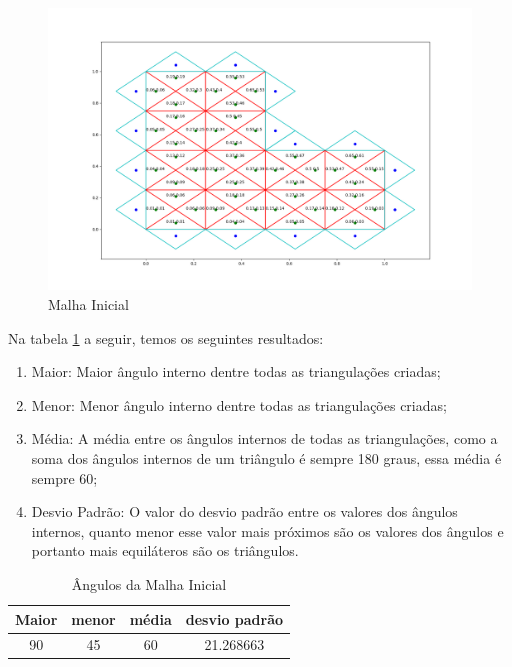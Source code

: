 \begin{figure}[ht]
    \centering
    \includegraphics[width=1\linewidth]{fig/malha_inicial.png}
    \caption{Malha Inicial}
    \label{fig:malha-inicial}
\end{figure}

Na tabela \ref{tab:angulos-malha-inicial} a seguir, temos os seguintes resultados:

\begin{enumerate}
    \item Maior: Maior ângulo interno dentre todas as triangulações criadas;
    \item Menor: Menor ângulo interno dentre todas as triangulações criadas;
    \item Média: A média entre os ângulos internos de todas as triangulações, como a soma dos ângulos internos de um triângulo é sempre 180 graus, essa média é sempre 60;
    \item Desvio Padrão: O valor do desvio padrão entre os valores dos ângulos internos, quanto menor esse valor mais próximos são os valores dos ângulos e portanto mais equiláteros são os triângulos.
\end{enumerate}

\begin{table}[hb]
 \centering
 \par\caption{Ângulos da Malha Inicial}
\begin{tabular}{c|c|c|c}
 Maior&menor&média&desvio padrão\\\hline\hline
  90&45&60&21.268663\\\hline
 \end{tabular}
 \label{tab:angulos-malha-inicial}
\end{table}

